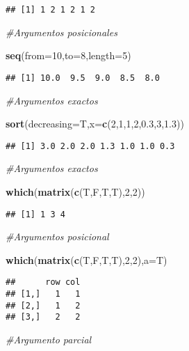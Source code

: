 \documentclass[]{article}
\newenvironment{Shaded}{\begin{snugshade}}{\end{snugshade}}
\newcommand{\KeywordTok}[1]{\textcolor[rgb]{0.13,0.29,0.53}{\textbf{#1}}}
\newcommand{\DataTypeTok}[1]{\textcolor[rgb]{0.13,0.29,0.53}{#1}}
\newcommand{\DecValTok}[1]{\textcolor[rgb]{0.00,0.00,0.81}{#1}}
\newcommand{\FloatTok}[1]{\textcolor[rgb]{0.00,0.00,0.81}{#1}}
\newcommand{\CommentTok}[1]{\textcolor[rgb]{0.56,0.35,0.01}{\textit{#1}}}
\newcommand{\NormalTok}[1]{#1}
\begin{document}
\begin{verbatim}
## [1] 1 2 1 2 1 2
\end{verbatim}

\begin{Shaded}
\begin{Highlighting}[]
\CommentTok{#Argumentos posicionales}

\KeywordTok{seq}\NormalTok{(}\DataTypeTok{from=}\DecValTok{10}\NormalTok{,}\DataTypeTok{to=}\DecValTok{8}\NormalTok{,}\DataTypeTok{length=}\DecValTok{5}\NormalTok{)}
\end{Highlighting}
\end{Shaded}

\begin{verbatim}
## [1] 10.0  9.5  9.0  8.5  8.0
\end{verbatim}

\begin{Shaded}
\begin{Highlighting}[]
\CommentTok{#Argumentos exactos}

\KeywordTok{sort}\NormalTok{(}\DataTypeTok{decreasing=}\NormalTok{T,}\DataTypeTok{x=}\KeywordTok{c}\NormalTok{(}\DecValTok{2}\NormalTok{,}\DecValTok{1}\NormalTok{,}\DecValTok{1}\NormalTok{,}\DecValTok{2}\NormalTok{,}\FloatTok{0.3}\NormalTok{,}\DecValTok{3}\NormalTok{,}\FloatTok{1.3}\NormalTok{))}
\end{Highlighting}
\end{Shaded}

\begin{verbatim}
## [1] 3.0 2.0 2.0 1.3 1.0 1.0 0.3
\end{verbatim}

\begin{Shaded}
\begin{Highlighting}[]
\CommentTok{#Argumentos exactos}

\KeywordTok{which}\NormalTok{(}\KeywordTok{matrix}\NormalTok{(}\KeywordTok{c}\NormalTok{(T,F,T,T),}\DecValTok{2}\NormalTok{,}\DecValTok{2}\NormalTok{))}
\end{Highlighting}
\end{Shaded}

\begin{verbatim}
## [1] 1 3 4
\end{verbatim}

\begin{Shaded}
\begin{Highlighting}[]
\CommentTok{#Argumentos posicional }

\KeywordTok{which}\NormalTok{(}\KeywordTok{matrix}\NormalTok{(}\KeywordTok{c}\NormalTok{(T,F,T,T),}\DecValTok{2}\NormalTok{,}\DecValTok{2}\NormalTok{),}\DataTypeTok{a=}\NormalTok{T)}
\end{Highlighting}
\end{Shaded}

\begin{verbatim}
##      row col
## [1,]   1   1
## [2,]   1   2
## [3,]   2   2
\end{verbatim}

\begin{Shaded}
\begin{Highlighting}[]
\CommentTok{#Argumento parcial}
\end{Highlighting}
\end{Shaded}
\end{document}
